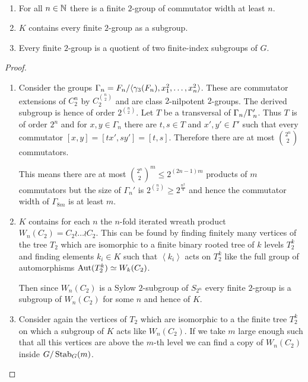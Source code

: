 \documentclass[a4paper,11pt]{amsart}
\begin{document}
\begin{pro}\ 
 \begin{enumerate}
  \item For all $n\in\mathbb{N}$ there is a finite $2$-group of commutator width at least $n$.
  \item $K$ contains every finite $2$-group as a subgroup.
  \item Every finite $2$-group is a quotient of two finite-index subgroups of $G$.
 \end{enumerate}
\end{pro}
\begin{proof}\
 \begin{enumerate}
  \item Consider the groups $\Gamma_n={F_n/\langle \gamma_3(F_n),x_1^2,\dotsc,x_n^2\rangle}$. 
  These are commutator extensions of $C_2^n$ by $C_2^{\binom{n}{2}}$ and are class $2$-nilpotent $2$-groups.
  The derived subgroup is hence of order $2^{\binom{n}{2}}$.
  Let $T$ be a transversal of ${\Gamma_n/\Gamma_n'}$. Thus $T$ is of order $2^n$ and
  for $x,y\in\Gamma_n$ there are $t,s\in T$ and $x',y'\in\Gamma'$ such that
  every commutator $[x,y]=[tx',sy']=[t,s]$. Therefore there are at most $\binom{2^n}{2}$ commutators.
  
  This means there are at most $\binom{2^n}{2}^m\leq 2^{(2n-1)m}$ products of $m$ commutators 
  but the size of $\Gamma_n'$ is $2^{\binom{n}{2}} \geq2^{\frac{n^2}{4}}$ and hence 
  the commutator width of $\Gamma_{8m}$ is at least $m$.
  \item  $K$ contains for each $n$ the $n$-fold iterated wreath product
  $W_n(C_2)=C_2\wr \dots \wr C_2$. 
  This can be found by finding finitely many vertices of the tree $T_2$ which
  are isomorphic to a finite binary rooted tree of $k$ levels $T_2^k$ and finding 
  elements $k_i\in K$ such that $\left<k_i\right>$ acts on $T_2^k$ like the full group of 
  automorphisms $\operatorname{{Aut}}(T_2^k)\simeq W_k(C_2)$.
  
  Then 
  since $W_n(C_2)$ is a Sylow $2$-subgroup of $S_{2^n}$ every finite $2$-group is a subgroup of
  $W_n(C_2)$ for some $n$ and hence of $K$.
  \item Consider again the vertices of $T_2$ which are isomorphic to a
  the finite tree $T_2^k$ on which a subgroup of $K$ acts like $W_n(C_2)$. If we take $m$ large
  enough such that all this vertices are above the $m$-th level we can find a copy of $W_n(C_2)$
  inside ${G/\operatorname{Stab}_G(m)}$.\qedhere
 \end{enumerate}
\end{proof}
\end{document}
